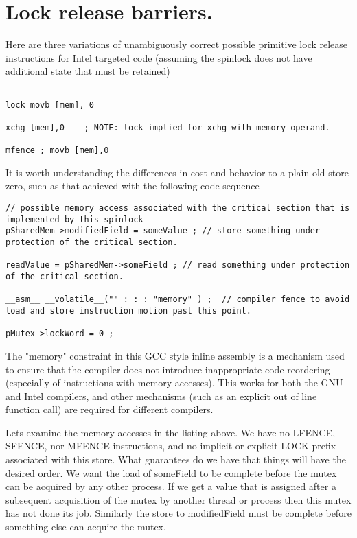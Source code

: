 {{\section{Lock release barriers.}

Here are three variations of unambiguously correct possible primitive lock release instructions for Intel targeted code (assuming the spinlock does not have additional state that must be retained)

\begin{lstlisting}

lock movb [mem], 0

xchg [mem],0	; NOTE: lock implied for xchg with memory operand.

mfence ; movb [mem],0 

\end{lstlisting}

It is worth understanding the differences in cost and behavior to a plain old store zero, such as that achieved with the following code sequence

\begin{lstlisting}
// possible memory access associated with the critical section that is implemented by this spinlock
pSharedMem->modifiedField = someValue ; // store something under protection of the critical section.

readValue = pSharedMem->someField ; // read something under protection of the critical section.

__asm__ __volatile__("" : : : "memory" ) ;  // compiler fence to avoid load and store instruction motion past this point.

pMutex->lockWord = 0 ;
\end{lstlisting}

The "memory" constraint in this GCC style inline assembly is a mechanism used to ensure that the compiler does not introduce inappropriate code reordering (especially of instructions with memory accesses).  This works for both the GNU and Intel compilers, and other mechanisms (such as an explicit out of line function call) are required for different compilers.

Lets examine the memory accesses in the listing above.  We have no LFENCE, SFENCE, nor MFENCE instructions, and no implicit or explicit LOCK prefix associated with this store.  What guarantees do we have that things will have the desired order.  We want the load of someField to be complete before the mutex can be acquired by any other process.  If we get a value that is assigned after a subsequent acquisition of the mutex by another thread or process then this mutex has not done its job.  Similarly the store to modifiedField must be complete before something else can acquire the mutex.

}}
